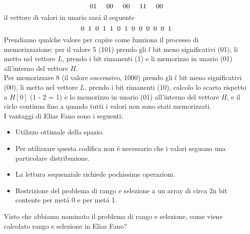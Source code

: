 \begin{equation*}
    01\hspace{5mm}00\hspace{5mm}00\hspace{5mm}11\hspace{5mm}00
\end{equation*}
il vettore di valori in unario sará il seguente
\begin{equation*}
    0\hspace{2mm}1\hspace{2mm}0\hspace{2mm}1\hspace{2mm}1\hspace{2mm}0\hspace{2mm}1\hspace{2mm}0\hspace{2mm}0\hspace{2mm}0\hspace{2mm}0\hspace{2mm}0\hspace{2mm}1
\end{equation*}
Prendiamo qualche valore per capire come funziona il processo di memorizzazione:
per il valore 5 (101) prendo gli $l$ bit meno significativi (01), li metto nel vettore $L$, prendo i bit rimanenti (1) e li memorizzo in unario (01) all'interno del vettore $H$.\\
Per memorizzare 8 (il valore successivo, 1000) prendo gli $l$ bit meno significativi (00), li metto nel vettore $L$, prendo i bit rimanenti (10), calcolo lo scarto rispetto a $H[0]$ (1 - 2 = 1) e lo memorizzo in unario (01) all'interno del vettore $H$, e il ciclo continua fino a quando tutti i valori non sono stati memorizzati.\\
I vantaggi di Elias Fano sono i seguenti:
\begin{itemize}
    \item Utilizzo ottimale dello spazio.
    \item Per utilizzare questa codifica non é necessario che i valori seguano una particolare distribuzione.
    \item La lettura sequenziale richiede pochissime operazioni.
    \item Restrizione del problema di rango e selezione a un array di circa 2n bit contente per metá 0 e per metá 1.
\end{itemize}
Visto che abbiamo nominato il problema di rango e selezione, come viene calcolato rango e selezione in Elias Fano?\\
